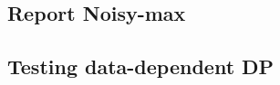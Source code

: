 \subsection{Report Noisy-max}
\label{subsection:report_noisy_max}


\subsection{Testing data-dependent DP}
\label{subsection:testing_data_DP}

\begin{comment}
\begin{example}(\emph{Laplace Mechanism}) \label{examp:lap_mech}

Given a function $f: \mathcal{X} \rightarrow \mathbb{R}$, we will define
\begin{align*}
    \mathcal{M}_{\phi}(X) = f(X) + \text{Lap}\left(\phi\right).
\end{align*}
A rote calculation with the Laplace distribution tells us that
\begin{align*}
    \log \dfrac{\text{Pr}[\mathcal{M}_{\phi}(X) = y]}{\text{Pr}[\mathcal{M}_{\phi}(X') = y]} &\leq \dfrac{|f(X) - f(X')|}{\phi}.
\end{align*}
Using the above calculation and  Definition~\ref{def:data_dep_dp},
\begin{align*}
    \epsilon_{\phi}(X) = \max\limits_{X': X' \simeq X} \frac{|f(X) - f(X')|}{\phi} = \frac{\Delta_{LS}(X)}{\phi}.
\end{align*}
We can then verify that choosing $\phi = \beta/\hat{\epsilon}$ and $\hat{\epsilon} = \epsilon$ reduces Algorithm~\ref{alg:no_ls} exactly to Algorithm~\ref{alg:classic_ptr}.
\end{example}
\end{comment}




